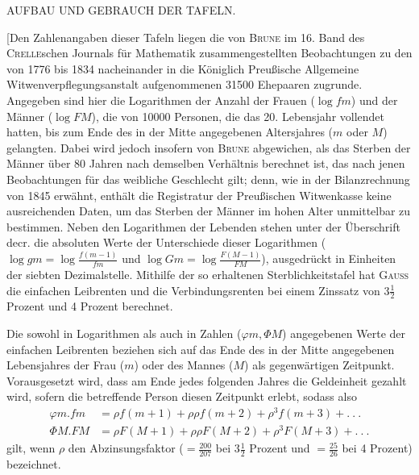 \clearpage
{}
\begin{center}AUFBAU UND GEBRAUCH DER TAFELN.\end{center}
\noindent\hspace*{1.2em} [Den Zahlenangaben dieser Tafeln liegen die von \textsc{Brune} im 16. Band des \textsc{Crelle}schen Journals für Mathematik zusammengestellten Beobachtungen zu den von 1776 bis 1834 nacheinander in die Königlich Preußische Allgemeine Witwenverpflegungsanstalt aufgenommenen 31500 Ehepaaren zugrunde. Angegeben sind hier die Logarithmen der Anzahl der Frauen (\(\log fm\)) und der Männer (\(\log FM\)), die von 10000 Personen, die das 20. Lebensjahr vollendet hatten, bis zum Ende des in der Mitte angegebenen Altersjahres (\(m\) oder \(M\)) gelangten. Dabei wird jedoch insofern von \textsc{Brune} abgewichen, als das Sterben der Männer über 80 Jahren nach demselben Verhältnis berechnet ist, das nach jenen Beobachtungen für das weibliche Geschlecht gilt; denn, wie in der Bilanzrechnung von 1845 erwähnt, enthält die Registratur der Preußischen Witwenkasse keine ausreichenden Daten, um das Sterben der Männer im hohen Alter unmittelbar zu bestimmen. Neben den Logarithmen der Lebenden stehen unter der Überschrift decr. die absoluten Werte der Unterschiede dieser Logarithmen (\(\log gm=\log\frac{f(m-1)}{fm}\) und \(\log Gm=\log\frac{F(M-1)}{FM}\)), ausgedrückt in Einheiten der siebten Dezimalstelle. Mithilfe der so erhaltenen Sterblichkeitstafel hat \textsc{Gauss} die einfachen Leibrenten und die Verbindungsrenten bei einem Zinssatz von \(3\tfrac{1}{2}\) Prozent und 4 Prozent berechnet.

Die sowohl in Logarithmen als auch in Zahlen (\(\varphi m,\Phi M\)) angegebenen Werte der einfachen Leibrenten beziehen sich auf das Ende des in der Mitte angegebenen Lebensjahres der Frau (\(m\)) oder des Mannes (\(M\)) als gegenwärtigen Zeitpunkt. Vorausgesetzt wird, dass am Ende jedes folgenden Jahres die Geldeinheit gezahlt wird, sofern die betreffende Person diesen Zeitpunkt erlebt, sodass also
\[
\begin{aligned}
\varphi m\mathord{.}fm&=\rho f(m+1)+\rho\rho f(m+2)+\rho^3f(m+3)+.\ .\ .\\
\Phi M\mathord{.}FM&=\rho F(M+1)+\rho\rho F(M+2)+\rho^3F(M+3)+.\ .\ .
\end{aligned}
\]
gilt, wenn \(\rho\) den Abzinsungsfaktor (\(=\tfrac{200}{207}\) bei \(3\tfrac{1}{2}\) Prozent und \(=\tfrac{25}{26}\) bei 4 Prozent) bezeichnet.

